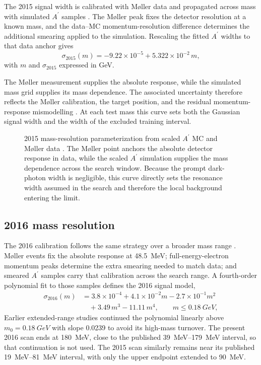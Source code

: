 The 2015 signal width is calibrated with M{\o}ller data and propagated across mass
with simulated $A^\prime$ samples \cite{HPS2015InternalNote}. The M{\o}ller peak fixes
the detector resolution at a known mass, and the data--MC momentum-resolution
difference determines the additional smearing applied to the simulation. Rescaling
the fitted $A^\prime$ widths to that data anchor gives
\begin{equation}
\sigma_{2015}(m) = -9.22\times10^{-5} + 5.322\times10^{-2}\,m,
\label{eq:sigma2015}
\end{equation}
with $m$ and $\sigma_{2015}$ expressed in GeV.

The M{\o}ller measurement supplies the absolute response, while the simulated mass
grid supplies its mass dependence. The associated uncertainty therefore reflects the
M{\o}ller calibration, the target position, and the residual momentum-response
mismodelling \cite{HPS2015DarkPhoton,HPS2015InternalNote}. At each test mass this curve
sets both the Gaussian signal width and the width of the excluded training interval.

\begin{figure}[H]
\centering
{}
\caption{2015 mass-resolution parameterization from scaled $A^\prime$ MC and M{\o}ller
data \cite{HPS2015InternalNote}. The M{\o}ller point anchors the absolute detector
response in data, while the scaled $A^\prime$ simulation supplies the mass dependence
across the search window. Because the prompt dark-photon width is negligible, this
curve directly sets the resonance width assumed in the search and therefore the local
background entering the limit.}
\label{fig:2015-resolution}
\end{figure}

\subsection{2016 mass resolution}
\label{sec:massres-2016}

The 2016 calibration follows the same strategy over a broader mass range
\cite{HPS2016BumpInternal,HPS2016PromptLong}. M{\o}ller events fix the absolute
response at \SI{48.5}{MeV}; full-energy-electron momentum peaks determine the extra
smearing needed to match data; and smeared $A^\prime$ samples carry that calibration
across the search range. A fourth-order polynomial fit to those samples defines the
2016 signal model,
\begin{align}
\sigma_{2016}(m) &= 3.8\times10^{-4} + 4.1\times10^{-2}m - 2.7\times10^{-1}m^2 \nonumber\\
&\quad + 3.49\,m^3 - 11.11\,m^4,
\qquad m \le \SI{0.18}{GeV},
\label{eq:sigma2016}
\end{align}
Earlier extended-range studies continued the polynomial linearly above
$m_0=\SI{0.18}{GeV}$ with slope \num{0.0239} to avoid its high-mass turnover. The
present 2016 scan ends at \SI{180}{MeV}, close to the published \SIrange{39}{179}{MeV}
interval, so that continuation is not used. The 2015 scan similarly remains near its
published \SIrange{19}{81}{MeV} interval, with only the upper endpoint extended to
\SI{90}{MeV}.

